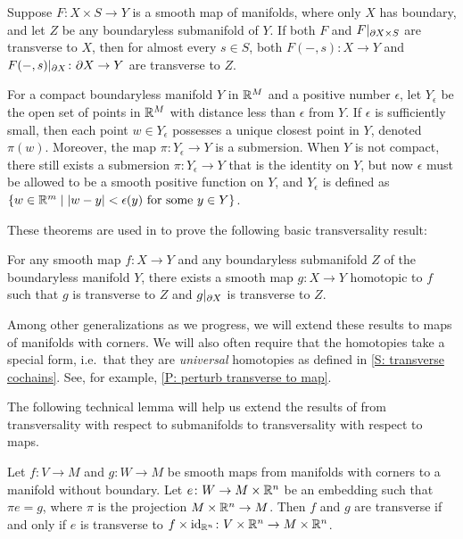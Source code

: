 \begin{theorem}
	Suppose $F \colon X\times S\to Y$ is a smooth map of manifolds, where only $X$ has boundary, and let $Z$ be any boundaryless submanifold of $Y$.
	If both $F$ and $F|_{\partial X\times S}$ are transverse to $X$, then for almost every $s\in S$, both $F(-,s) \colon X\to Y$ and $F(-,s)|_{\partial X} \colon \partial X\to Y$ are transverse to $Z$.
\end{theorem}

\begin{theorem}
	For a compact boundaryless manifold $Y$ in $\mathbb{R}^M$ and a positive number $\epsilon$, let $Y_\epsilon$ be the open set of points in $\mathbb{R}^M$ with distance less than $\epsilon$ from $Y$.
	If $\epsilon$ is sufficiently small, then each point $w\in Y_\epsilon$ possesses a unique closest point in $Y$, denoted $\pi(w)$.
	Moreover, the map $\pi \colon Y_\epsilon\to Y$ is a submersion.
	When $Y$ is not compact, there still exists a submersion $\pi \colon Y_\epsilon\to Y$ that is the identity on $Y$, but now $\epsilon$ must be allowed to be a smooth positive function on $Y$, and $Y_\epsilon$ is defined as $\{w\in \mathbb{R}^m \mid |w-y|<\epsilon(y) \text{\ for some\ } y \in Y\}$.
\end{theorem}

These theorems are used in \cite{GuPo74} to prove the following basic transversality result:

\begin{theorem}
	For any smooth map $f \colon X\to Y$ and any boundaryless submanifold $Z$ of the boundaryless manifold $Y$, there exists a smooth map $g \colon X\to Y$ homotopic to $f$ such that $g$ is transverse to $Z$ and $g|_{\partial X}$ is transverse to $Z$.
\end{theorem}

Among other generalizations as we progress, we will extend these results to maps of manifolds with corners.
We will also often require that the homotopies take a special form, i.e.\ that they are \textit{universal} homotopies as defined in \cref{S: transverse cochains}.
See, for example, \cref{P: perturb transverse to map}.

The following technical lemma will help us extend the results of \cite{GuPo74} from transversality with respect to submanifolds to transversality with respect to maps.

\begin{lemma}\label{L: all transversality is wrt embeddings}
	Let $f \colon V\to M$ and $g \colon W\to M$ be smooth maps from manifolds with corners to a manifold without boundary.
	Let $e \colon W\to M\times \mathbb{R}^n$ be an embedding such that $\pi e=g$, where $\pi$ is the projection $M\times \mathbb{R}^n\to M$.
	Then $f$ and $g$ are transverse if and only if $e$ is transverse to $f\times\mathrm{id}_{\mathbb{R}^n} \colon V\times \mathbb{R}^n\to M\times \mathbb{R}^n$.
\end{lemma}

